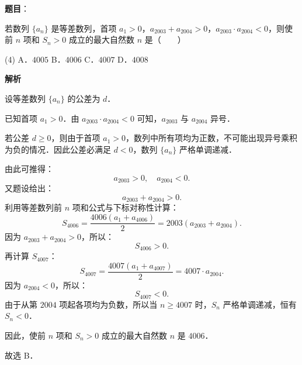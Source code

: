 \begin{answer}

\textbf{题目}：

若数列 $\{a_n\}$ 是等差数列，首项 $a_1 > 0$，$a_{2003} + a_{2004} > 0$，$a_{2003} \cdot a_{2004} < 0$，则使前 $n$ 项和 $S_n > 0$ 成立的最大自然数 $n$ 是\mbox{（　　）}

\begin{gkopts}(4)
\task A．$4005$
\task B．$4006$
\task C．$4007$
\task D．$4008$
\end{gkopts}

\textbf{解析}

设等差数列 $\{a_n\}$ 的公差为 $d$．

已知首项 $a_1 > 0$．由 $a_{2003} \cdot a_{2004} < 0$ 可知，$a_{2003}$ 与 $a_{2004}$ 异号．

若公差 $d \geqslant 0$，则由于首项 $a_1 > 0$，数列中所有项均为正数，不可能出现异号乘积为负的情况．因此公差必满足 $d < 0$，数列 $\{a_n\}$ 严格单调递减．

由此可推得：
\nopagebreak[4]
\[
a_{2003} > 0, \quad a_{2004} < 0.
\]
又题设给出：
\nopagebreak[4]
\[
a_{2003} + a_{2004} > 0.
\]
利用等差数列前 $n$ 项和公式与下标对称性计算：
\nopagebreak[4]
\[
S_{4006} = \frac{4006(a_1 + a_{4006})}{2} = 2003(a_{2003} + a_{2004}).
\]
因为 $a_{2003} + a_{2004} > 0$，所以：
\nopagebreak[4]
\[
S_{4006} > 0.
\]
再计算 $S_{4007}$：
\nopagebreak[4]
\[
S_{4007} = \frac{4007(a_1 + a_{4007})}{2} = 4007 \cdot a_{2004}.
\]
因为 $a_{2004} < 0$，所以：
\nopagebreak[4]
\[
S_{4007} < 0.
\]
由于从第 $2004$ 项起各项均为负数，所以当 $n \geqslant 4007$ 时，$S_n$ 严格单调递减，恒有 $S_n < 0$．

因此，使前 $n$ 项和 $S_n > 0$ 成立的最大自然数 $n$ 是 $4006$．

故选 B．


\end{answer}
